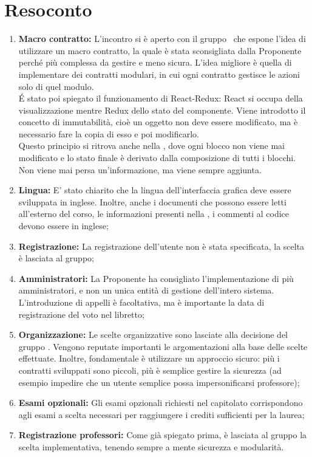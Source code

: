 \documentclass[VER-2017-12-08.tex]{subfiles}
\begin{document}
\chapter{Resoconto}
\begin{enumerate}
	\item \textbf{Macro contratto:} L'incontro si è aperto con il gruppo \gruppo\ che espone l'idea di utilizzare un macro contratto, la quale è stata sconsigliata dalla Proponente perché più complessa da gestire e meno sicura. L'idea migliore è quella di implementare dei contratti modulari, in cui ogni contratto gestisce le azioni solo di quel modulo.\\
	\'{E} stato poi spiegato il funzionamento di React-Redux: React si occupa della visualizzazione mentre Redux dello stato del componente. Viene introdotto il concetto di immutabilità, cioè un oggetto non deve essere modificato, ma è necessario fare la copia di esso e poi modificarlo.\\
	Questo principio si ritrova anche nella , dove ogni blocco non viene mai modificato e lo stato finale è derivato dalla composizione di tutti i blocchi. Non viene mai persa un'informazione, ma viene sempre aggiunta.
	\item \textbf{Lingua:} E' stato chiarito che la lingua dell'interfaccia grafica deve essere sviluppata in inglese. Inoltre, anche i documenti che possono essere letti all'esterno del corso, le informazioni presenti nella  , i commenti al codice devono essere in inglese;
	\item \textbf{Registrazione:} La registrazione dell'utente non è stata specificata, la scelta è lasciata al gruppo;
	\item \textbf{Amministratori:} La Proponente ha consigliato l'implementazione di più amministratori, e non un unica entità di gestione dell'intero sistema. L'introduzione di appelli è facoltativa, ma è importante la data di registrazione del voto nel libretto;
	\item \textbf{Organizzazione:} Le scelte organizzative sono lasciate alla decisione del gruppo \gruppo. Vengono reputate importanti le argomentazioni alla base delle scelte effettuate. Inoltre, fondamentale è utilizzare un approccio sicuro: più i contratti sviluppati sono piccoli, più è semplice gestire la sicurezza (ad esempio impedire che un utente semplice possa impersonificarsi professore);
	\item \textbf{Esami opzionali:} Gli esami opzionali richiesti nel capitolato corrispondono agli esami a scelta necessari per raggiungere i crediti sufficienti per la laurea;
	\item \textbf{Registrazione professori:} Come già spiegato prima, è lasciata al gruppo la scelta implementativa, tenendo sempre a mente sicurezza e modularità.
\end{enumerate}
\end{document}

